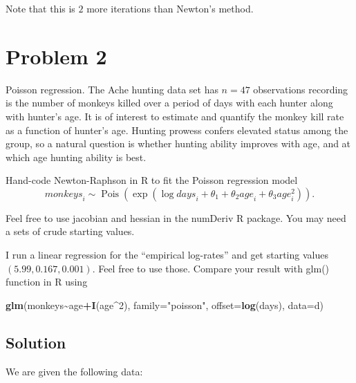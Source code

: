 \documentclass[
  10pt,
  twocolumn]{article}
\newenvironment{Shaded}{\begin{snugshade}}{\end{snugshade}}
\newcommand{\AttributeTok}[1]{\textcolor[rgb]{0.13,0.29,0.53}{#1}}
\newcommand{\DecValTok}[1]{\textcolor[rgb]{0.00,0.00,0.81}{#1}}
\newcommand{\FunctionTok}[1]{\textcolor[rgb]{0.13,0.29,0.53}{\textbf{#1}}}
\newcommand{\NormalTok}[1]{#1}
\newcommand{\SpecialCharTok}[1]{\textcolor[rgb]{0.81,0.36,0.00}{\textbf{#1}}}
\newcommand{\StringTok}[1]{\textcolor[rgb]{0.31,0.60,0.02}{#1}}
\begin{document}
Note that this is \(2\) more iterations than Newton's method.

\hypertarget{problem-2}{%
\section{Problem 2}\label{problem-2}}

Poisson regression. The Ache hunting data set has \(n = 47\)
observations recording is the number of monkeys killed over a period of
days with each hunter along with hunter's age. It is of interest to
estimate and quantify the monkey kill rate as a function of hunter's
age. Hunting prowess confers elevated status among the group, so a
natural question is whether hunting ability improves with age, and at
which age hunting ability is best.

Hand-code Newton-Raphson in R to fit the Poisson regression model \[
  \mathit{monkeys}_i \sim \operatorname{Pois}\left(\exp(\log \mathit{days}_i  + \theta_1 + \theta_2 \mathit{age}_i + \theta_3 \mathit{age}_i^2)\right).
\]

Feel free to use jacobian and hessian in the numDeriv R package. You may
need a sets of crude starting values.

I run a linear regression for the ``empirical log-rates'' and get
starting values \((5.99, 0.167, 0.001)\). Feel free to use those.
Compare your result with glm() function in R using

\begin{Shaded}
\begin{Highlighting}[]
\FunctionTok{glm}\NormalTok{(monkeys}\SpecialCharTok{\textasciitilde{}}\NormalTok{age}\SpecialCharTok{+}\FunctionTok{I}\NormalTok{(age}\SpecialCharTok{\^{}}\DecValTok{2}\NormalTok{), }\AttributeTok{family=}\StringTok{"poisson"}\NormalTok{, }\AttributeTok{offset=}\FunctionTok{log}\NormalTok{(days), }\AttributeTok{data=}\NormalTok{d)}
\end{Highlighting}
\end{Shaded}

\hypertarget{solution}{%
\subsection{Solution}\label{solution}}

We are given the following data:
\end{document}
